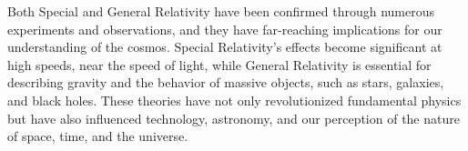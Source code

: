 Both Special and General Relativity have been confirmed through numerous experiments and observations, and they have far-reaching implications for our understanding of the cosmos. Special Relativity's effects become significant at high speeds, near the speed of light, while General Relativity is essential for describing gravity and the behavior of massive objects, such as stars, galaxies, and black holes. These theories have not only revolutionized fundamental physics but have also influenced technology, astronomy, and our perception of the nature of space, time, and the universe.